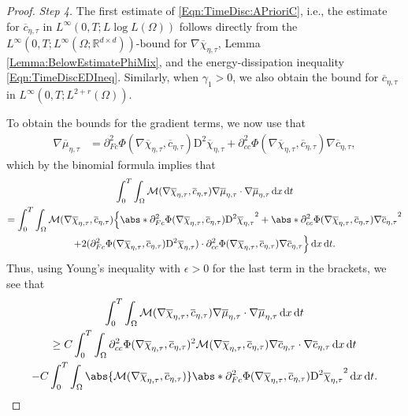\documentclass[a4paper,12pt]{article}
\newcommand{\R}{\mathbb{R}}
\newcommand{\calM}{\mathcal{M}}
\newcommand{\pl}{\partial}
\newcommand{\dx}{\mathrm{\,d}x}
\newcommand{\dt}{\mathrm{\,d}t}
\newcommand{\chibar}{\overline{\chi}}
\newcommand{\mubar}{\overline{\mu}}
\newcommand{\cbar}{\overline{c}}
\newcommand{\rmD}{\mathrm{D}}
\theoremstyle{plain}
\theoremstyle{definition}
\numberwithin{equation}{section}
\begin{document}
\begin{proof}
		\medskip

        \emph{Step 4.} The first estimate of \eqref{Eqn:TimeDisc:APrioriC}, i.e., the estimate for $\cbar_{\eta,\tau}$ in $L^\infty(0,T;L\log L(\Omega))$ %
follows directly from the 
$L^\infty(0,T;L^\infty(\Omega;\R^{d\times d}))$-bound for $\nabla\chibar_{\eta,\tau}$, Lemma \ref{Lemma:BelowEstimatePhiMix}, and the energy-dissipation inequality \eqref{Eqn:TimeDiscEDIneq}. Similarly, when $\gamma_1>0$, we also obtain the bound for $\cbar_{\eta,\tau}$ in $L^\infty(0,T;L^{2+r}(\Omega))$.  

To obtain the bounds for the gradient terms, %
we now use that
    \begin{align*}
        \nabla\mubar_{\eta,\tau} &= \pl^2_{Fc}\Phi(\nabla\chibar_{\eta,\tau},\cbar_{\eta,\tau})\rmD^2\chibar_{\eta,\tau} + \pl^2_{cc}\Phi(\nabla\chibar_{\eta,\tau},\cbar_{\eta,\tau})\nabla \cbar_{\eta,\tau},
    \end{align*}
    which by the binomial formula implies that
    \begin{multline*}
        \int_0^T\int_\Omega \calM(\nabla\chibar_{\eta,\tau},\cbar_{\eta,\tau})\nabla\mubar_{\eta,\tau}\cdot\nabla\mubar_{\eta,\tau} \dx\dt 
\\
= \int_0^T\int_\Omega \calM(\nabla\chibar_{\eta,\tau},\cbar_{\eta,\tau})\Big\{\abs*{\pl^2_{Fc}\Phi(\nabla\chibar_{\eta,\tau},\cbar_{\eta,\tau})\rmD^2\chibar_{\eta,\tau}}^2%
        + \abs*{\pl^2_{cc}\Phi(\nabla\chibar_{\eta,\tau},\cbar_{\eta,\tau})\nabla \cbar_{\eta,\tau}}^2\\+ 2(\pl^2_{Fc}\Phi(\nabla\chibar_{\eta,\tau},\cbar_{\eta,\tau})\rmD^2\chibar_{\eta,\tau}) \cdot \pl^2_{cc}\Phi(\nabla\chibar_{\eta,\tau},\cbar_{\eta,\tau})\nabla \cbar_{\eta,\tau}\Big\}\dx\dt. %
    \end{multline*}
    Thus, using Young's inequality with $\epsilon>0$ for the last term in the brackets, 
    we see that 
\begin{multline}
\int_0^T\int_\Omega \calM(\nabla\chibar_{\eta,\tau},\cbar_{\eta,\tau})\nabla\mubar_{\eta,\tau}\cdot\nabla\mubar_{\eta,\tau} \dx\dt\\ \geq C\int_0^T\int_\Omega \pl^2_{cc}\Phi(\nabla\chibar_{\eta,\tau},\cbar_{\eta,\tau})^2\calM(\nabla\chibar_{\eta,\tau},\cbar_{\eta,\tau})\nabla \cbar_{\eta,\tau}\cdot\nabla \cbar_{\eta,\tau} \dx\dt \\
- C\int_0^T\int_\Omega \abs{\calM(\nabla\chibar_{\eta,\tau},\cbar_{\eta,\tau})}\abs*{\pl^2_{Fc}\Phi(\nabla\chibar_{\eta,\tau},\cbar_{\eta,\tau})\rmD^2\chibar_{\eta,\tau}}^2 \dx\dt. \label{Eqn:FiniteStrain:Interm1}
    \end{multline}\smallskip


\end{proof}
\end{document}
